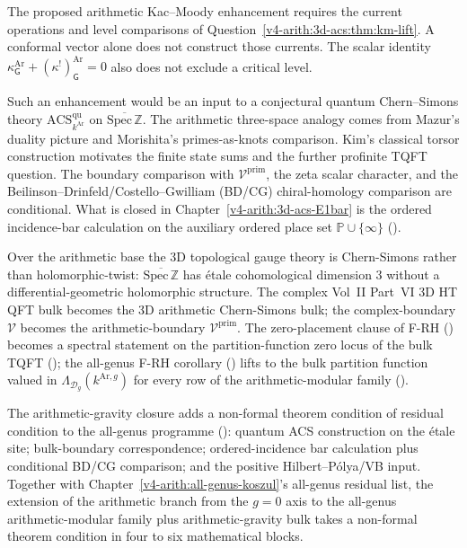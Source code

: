 The proposed arithmetic Kac--Moody enhancement requires the
current operations and level comparisons of
Question~\ref{v4-arith:3d-acs:thm:km-lift}.
A conformal vector alone does not construct those currents.
The scalar identity
\(\kappa^{\mathrm{Ar}}_{\mathsf G}+(\kappa^!)^{\mathrm{Ar}}_{\mathsf G}=0\)
also does not exclude a critical level.

Such an enhancement would be an input to a conjectural quantum
Chern--Simons theory \(\mathrm{ACS}^{\mathrm{qu}}_{k^{\mathrm{Ar}}}\)
on \(\overline{\mathrm{Spec}\,\mathbb Z}\).
The arithmetic three-space analogy comes from Mazur's duality
picture and Morishita's primes-as-knots comparison.
Kim's classical torsor construction motivates the finite state sums
and the further profinite TQFT question.
The boundary comparison with
\(\mathcal{V}^{\mathrm{prim}}\), the zeta scalar character, and the
Beilinson--Drinfeld/Costello--Gwilliam (BD/CG) chiral-homology
comparison are conditional. What is closed in
Chapter~\ref{v4-arith:3d-acs-E1bar} is the ordered incidence-bar
calculation on the auxiliary ordered place set
\(\mathbb{P}\cup\{\infty\}\)
().

Over the arithmetic base the 3D topological gauge theory is
Chern-Simons rather than holomorphic-twist: \(\overline{\mathrm{Spec}\,\mathbb{Z}}\)
has étale cohomological dimension \(3\) without a differential-geometric
holomorphic structure. The complex Vol~II Part~VI 3D HT QFT bulk
becomes the 3D arithmetic Chern-Simons bulk; the complex-boundary
\(\mathcal{V}\) becomes the arithmetic-boundary \(\mathcal{V}^{\mathrm{prim}}\).
The zero-placement clause of F-RH () becomes
a spectral statement on the partition-function zero locus of the bulk TQFT
(); the all-genus
F-RH corollary () lifts to the
bulk partition function valued in \(\Lambda_{\mathcal{D}_g}(k^{\mathrm{Ar},g})\)
for every row of the arithmetic-modular family
().

The arithmetic-gravity closure adds a non-formal theorem condition of
residual condition to the all-genus programme
(): quantum ACS construction on the
étale site; bulk-boundary correspondence; ordered-incidence bar
calculation plus conditional BD/CG comparison; and the positive
Hilbert--P\'olya/VB input. Together with Chapter~\ref{v4-arith:all-genus-koszul}'s
all-genus residual list, the extension of the arithmetic branch from
the \(g=0\) axis to the all-genus arithmetic-modular family plus
arithmetic-gravity bulk takes a non-formal theorem condition in four to
six mathematical blocks.
